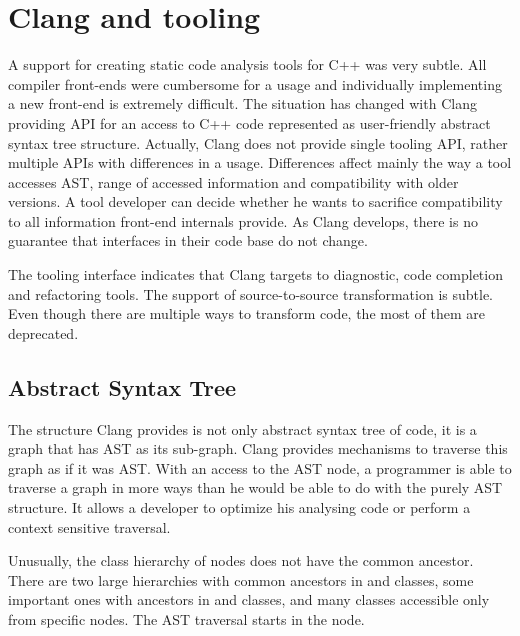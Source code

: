 \chapter{Clang and tooling}
\label{chapter-clang}
A support for creating static code analysis tools for C++ was very subtle. All compiler front-ends were cumbersome for a usage and individually implementing a new front-end is extremely difficult. The situation has changed with Clang providing API for an access to C++ code represented as user-friendly abstract syntax tree structure. Actually, Clang does not provide single tooling API, rather multiple APIs with differences in a usage. Differences affect mainly the way a tool accesses AST, range of accessed information and compatibility with older versions. A tool developer can decide whether he wants to sacrifice compatibility to all information front-end internals provide. As Clang develops, there is no guarantee that interfaces in their code base do not change.

The tooling interface indicates that Clang targets to diagnostic, code completion and refactoring tools. The support of source-to-source transformation is subtle. Even though there are multiple ways to transform code, the most of them are deprecated.

\section{Abstract Syntax Tree}
The structure Clang provides is not only abstract syntax tree of code, it is a graph that has AST as its sub-graph. Clang provides mechanisms to traverse this graph as if it was AST. With an access to the AST node, a programmer is able to traverse a graph in more ways than he would be able to do with the purely AST structure. It allows a developer to optimize his analysing code or perform a context sensitive traversal.

Unusually, the class hierarchy of nodes does not have the common ancestor. There are two large hierarchies with common ancestors in  and  classes, some important ones with ancestors in  and  classes, and many classes accessible only from specific nodes. The AST traversal starts in the  node. 

